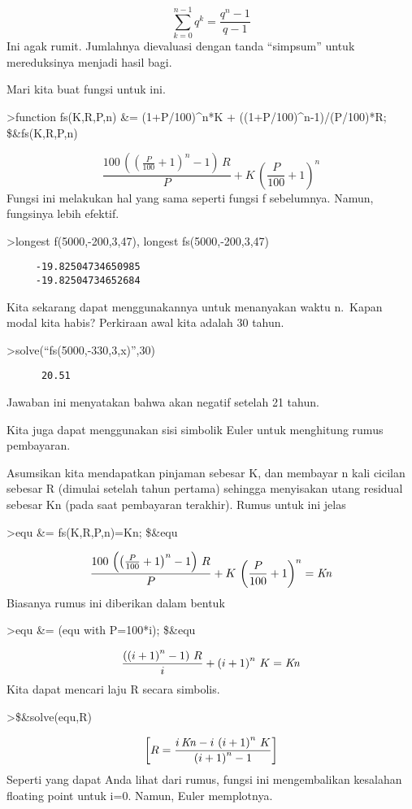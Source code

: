\documentclass[
]{book}
\begin{document}
\[\sum_{k=0}^{n-1}{q^{k}}=\frac{q^{n}-1}{q-1}\]Ini agak rumit. Jumlahnya dievaluasi dengan tanda ``simpsum'' untuk mereduksinya menjadi hasil bagi.

Mari kita buat fungsi untuk ini.

\textgreater function fs(K,R,P,n) \&= (1+P/100)\^{}n*K + ((1+P/100)\^{}n-1)/(P/100)*R; \$\&fs(K,R,P,n)

\[\frac{100\,\left(\left(\frac{P}{100}+1\right)^{n}-1\right)\,R}{P}+K\,\left(\frac{P}{100}+1\right)^{n}\]Fungsi ini melakukan hal yang sama seperti fungsi f sebelumnya. Namun, fungsinya lebih efektif.

\textgreater longest f(5000,-200,3,47), longest fs(5000,-200,3,47)

\begin{verbatim}
     -19.82504734650985 
     -19.82504734652684 
\end{verbatim}

Kita sekarang dapat menggunakannya untuk menanyakan waktu n.~Kapan modal kita habis? Perkiraan awal kita adalah 30 tahun.

\textgreater solve(``fs(5000,-330,3,x)'',30)

\begin{verbatim}
      20.51 
\end{verbatim}

Jawaban ini menyatakan bahwa akan negatif setelah 21 tahun.

Kita juga dapat menggunakan sisi simbolik Euler untuk menghitung rumus pembayaran.

Asumsikan kita mendapatkan pinjaman sebesar K, dan membayar n kali cicilan sebesar R (dimulai setelah tahun pertama) sehingga menyisakan utang residual sebesar Kn (pada saat pembayaran terakhir). Rumus untuk ini jelas

\textgreater equ \&= fs(K,R,P,n)=Kn; \$\&equ

\[\frac{100\,\left(\left(\frac{P}{100}+1\right)^{n}-1\right)\,R}{P}+K\,\left(\frac{P}{100}+1\right)^{n}={\it Kn}\]Biasanya rumus ini diberikan dalam bentuk

\textgreater equ \&= (equ with P=100*i); \$\&equ

\[\frac{\left(\left(i+1\right)^{n}-1\right)\,R}{i}+\left(i+1\right)^{n}\,K={\it Kn}\]Kita dapat mencari laju R secara simbolis.

\textgreater\$\&solve(equ,R)

\[\left[ R=\frac{i\,{\it Kn}-i\,\left(i+1\right)^{n}\,K}{\left(i+1\right)^{n}-1} \right]\]Seperti yang dapat Anda lihat dari rumus, fungsi ini mengembalikan kesalahan floating point untuk i=0. Namun, Euler memplotnya.
\end{document}
